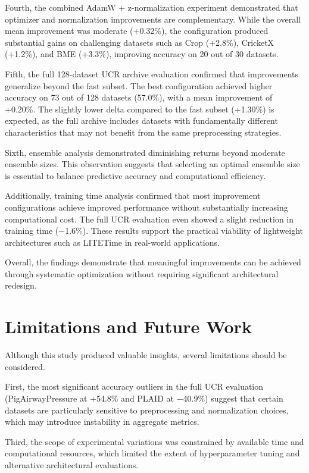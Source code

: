 \documentclass[conference]{IEEEtran}
\begin{document}
Fourth, the combined AdamW + z-normalization experiment demonstrated that optimizer and normalization improvements are complementary. While the overall mean improvement was moderate (+0.32\%), the configuration produced substantial gains on challenging datasets such as Crop (+2.8\%), CricketX (+1.2\%), and BME (+3.3\%), improving accuracy on 20 out of 30 datasets.

Fifth, the full 128-dataset UCR archive evaluation confirmed that improvements generalize beyond the fast subset. The best configuration achieved higher accuracy on 73 out of 128 datasets (57.0\%), with a mean improvement of +0.20\%. The slightly lower delta compared to the fast subset (+1.30\%) is expected, as the full archive includes datasets with fundamentally different characteristics that may not benefit from the same preprocessing strategies.

Sixth, ensemble analysis demonstrated diminishing returns beyond moderate ensemble sizes. This observation suggests that selecting an optimal ensemble size is essential to balance predictive accuracy and computational efficiency.

Additionally, training time analysis confirmed that most improvement configurations achieve improved performance without substantially increasing computational cost. The full UCR evaluation even showed a slight reduction in training time ($-$1.6\%). These results support the practical viability of lightweight architectures such as LITETime in real-world applications.

Overall, the findings demonstrate that meaningful improvements can be achieved through systematic optimization without requiring significant architectural redesign.


\section{Limitations and Future Work}

Although this study produced valuable insights, several limitations should be considered.

First, the most significant accuracy outliers in the full UCR evaluation (PigAirwayPressure at +54.8\% and PLAID at $-$40.9\%) suggest that certain datasets are particularly sensitive to preprocessing and normalization choices, which may introduce instability in aggregate metrics.

Third, the scope of experimental variations was constrained by available time and computational resources, which limited the extent of hyperparameter tuning and alternative architectural evaluations.
\end{document}
